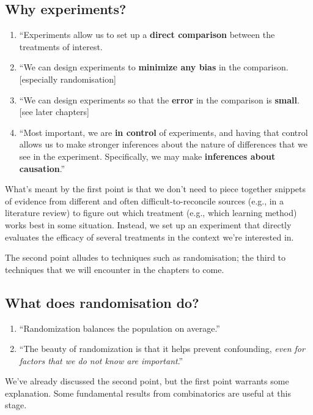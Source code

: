 \subsection{Why experiments?}
 \begin{enumerate}
  \item ``Experiments allow us to set up a \textbf{direct comparison} between the treatments of interest.
  \item ``We can design experiments to \textbf{minimize any bias} in the comparison. [especially randomisation]
  \item ``We can design experiments so that the \textbf{error} in the comparison is \textbf{small}. [see later chapters]
  \item ``Most important, we are \textbf{in control} of experiments, and having that control allows us to make stronger inferences about the nature of differences that we see in the experiment. Specifically, we may make \textbf{inferences about causation}.'' \citep[p.~2, my emphasis]{Oehlert2010}
 \end{enumerate}

What's meant by the first point is that we don't need to piece together snippets of evidence
from different and often difficult-to-reconcile sources (e.g., in a literature review) to figure
out which treatment (e.g., which learning method) works best in some situation.
Instead, we set up an experiment that directly evaluates the efficacy of several treatments
in the context we're interested in.

The second point alludes to techniques such as randomisation; the third to techniques
that we will encounter in the chapters to come.

\subsection{What does randomisation do?}
\begin{enumerate}
 \item ``Randomization balances the population on average.''
 \item ``The beauty of randomization is that it helps prevent confounding, \emph{even
for factors that we do not know are important}.'' \citep[p.~15, my emphasis]{Oehlert2010}
\end{enumerate}

We've already discussed the second point, 
but the first point warrants some explanation.
Some fundamental results from combinatorics are useful at this stage.

